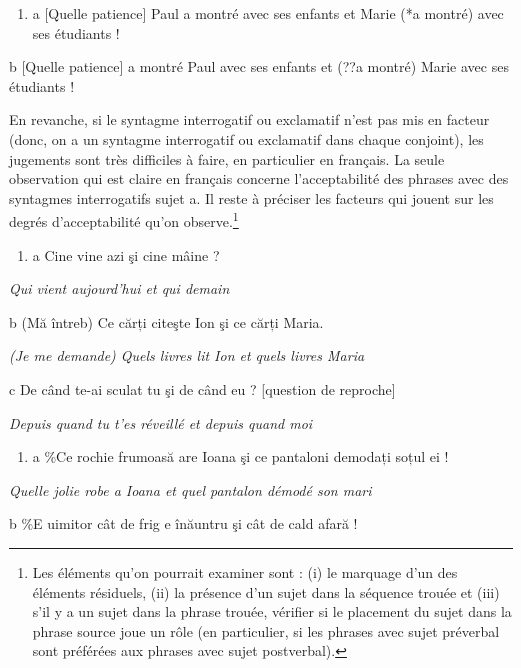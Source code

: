 \begin{enumerate}
\item \label{bkm:Ref299614060}a   [Quelle patience] Paul a montré avec ses enfants et Marie (*a montré) avec ses étudiants ! 


\end{enumerate}
  b  [Quelle patience] a montré Paul avec ses enfants et (??a montré) Marie avec ses étudiants ! 

En revanche, si le syntagme interrogatif ou exclamatif n'est pas mis en facteur (donc, on a un syntagme interrogatif ou exclamatif dans chaque conjoint), les jugements sont très difficiles à faire, en particulier en français. La seule observation qui est claire en français concerne l'acceptabilité des phrases avec des syntagmes interrogatifs sujet a. Il reste à préciser les facteurs qui jouent sur les degrés d'acceptabilité qu'on observe.\footnote{Les éléments qu'on pourrait examiner sont : (i) le marquage d'un des éléments résiduels, (ii) la présence d'un sujet dans la séquence trouée et (iii) s'il y a un sujet dans la phrase trouée, vérifier si le placement du sujet dans la phrase source joue un rôle (en particulier, si les phrases avec sujet préverbal sont préférées aux phrases avec sujet postverbal).} 


\begin{enumerate}
\item a  Cine vine azi şi cine mâine ? 


\end{enumerate}
{\itshape
Qui vient aujourd'hui et qui demain  } 

  b  (Mă întreb) Ce cărți citeşte Ion şi ce cărți Maria.

{\itshape
(Je me demande) Quels livres lit Ion et quels livres Maria   } 

  c  De când te-ai sculat tu şi de când eu ? [question de reproche]

{\itshape
    Depuis quand tu t'es réveillé et depuis quand moi          } 


\begin{enumerate}
\item a  \%Ce rochie frumoasă are Ioana şi ce pantaloni demodați soțul ei !


\end{enumerate}
{\itshape
Quelle jolie robe a Ioana et quel pantalon démodé son mari   } 

  b  \%E uimitor  cât  de  frig  e  înăuntru  şi  cât  de  cald   afară !

